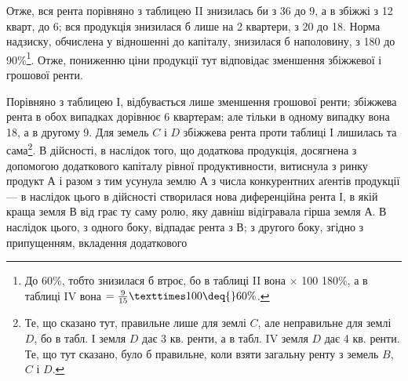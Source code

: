 Отже, вся рента порівняно з таблицею II знизилась би з 36
до 9, а в збіжжі з 12 кварт, до 6; вся продукція знизилася б лише на 2
квартери, з 20 до 18. Норма надзиску, обчислена у відношенні до капіталу,
знизилася б наполовину, з 180 до 90\%\footnote*{
До 60\%, тобто знизилася б втроє, бо в таблиці II вона \deq{}  × 100 \deq{} 180\%, а в таблиці
IV вона $= \frac{9}{15} × 100 \deq{} 60\%$. 
}. Отже, пониженню ціни продукції
тут відповідає зменшення збіжжевої і грошової ренти.

Порівняно з таблицею І, відбувається лише зменшення грошової ренти;
збіжжева рента в обох випадках дорівнює 6 квартерам; але тільки в одному
випадку вона \deq{} 18, а в другому \deq{} 9. Для земель $C$ і $D$
збіжжева рента проти таблиці І лишилась та сама\footnote*{
Те, що сказано тут, правильне лише для землі $C$, але неправильне для землі $D$, бо в табл. І земля
$D$ дає 3 кв. ренти, а в табл. IV земля $D$ дає 4 кв. ренти. Те, що тут сказано, було б правильне, коли
взяти загальну ренту з земель $B$, $C$ і $D$. 
}. В дійсності, в наслідок
того, що додаткова продукція, досягнена з допомогою додаткового капіталу рівної
продуктивности, витиснула з ринку продукт $А$ і разом з тим усунула землю $А$
з числа конкурентних аґентів продукції — в наслідок цього в дійсності створилася
нова диференційна рента І, в якій краща земля $В$ від грає ту саму ролю,
яку давніш відігравала гірша земля $А$. В наслідок цього, з одного боку, відпадає
рента з $В$; з другого боку, згідно з припущенням, вкладення додаткового
\parbreak{}  %
